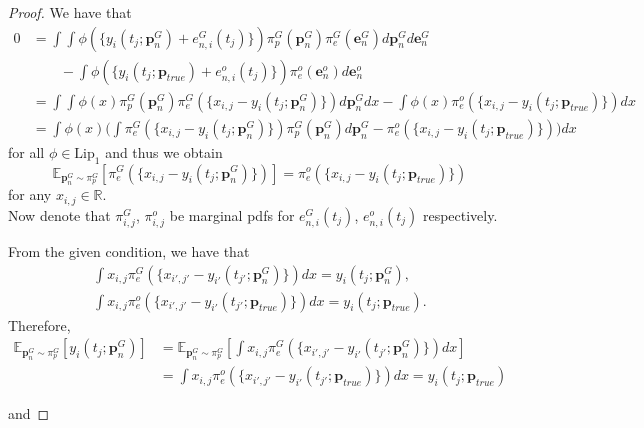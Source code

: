 \documentclass[letterpaper]{article} %
\theoremstyle{thmstyleone}%
\theoremstyle{thmstyletwo}%
\theoremstyle{thmstylethree}%
\begin{document}
\begin{proof}We have that
\begin{align*}
0 &= \int\int \phi(\{y_{i}(t_{j};\mathbf{p}_{n}^{G})+e_{n,i}^{G}(t_{j})\})\pi_{p}^{G}(\mathbf{p}_{n}^{G})
\pi_{e}^{G}(\mathbf{e}_{n}^{G})d\mathbf{p}_{n}^{G}d\mathbf{e}_{n}^{G}\\
 & \quad\quad -\int \phi(\{y_{i}(t_{j};\mathbf{p}_{true})+e_{n,i}^{o}(t_{j})\})\pi_{e}^{o}(\mathbf{e}_{n}^{o})d\mathbf{e}_{n}^{o} \\ 
&= \int\int \phi(x)\pi_{p}^{G}(\mathbf{p}_{n}^{G})\pi_{e}^{G}(\{x_{i,j}-y_{i}(t_{j};\mathbf{p}_{n}^{G})\})d\mathbf{p}_{n}^{G}dx-
\int \phi(x)\pi_{e}^{o}(\{x_{i,j}-y_{i}(t_{j};\mathbf{p}_{true})\})dx \\ &=\int \phi(x)\Bigg(
\int \pi_{e}^{G}(\{x_{i,j}-y_{i}(t_{j};\mathbf{p}_{n}^{G})\})\pi_{p}^{G}(\mathbf{p}_{n}^{G})d\mathbf{p}_{n}^{G}-\pi_{e}^{o}(\{x_{i,j}-y_{i}(t_{j};\mathbf{p}_{true})\})\Bigg)dx \end{align*} for all $\phi \in \text{Lip}_{1}$
and thus we obtain 
\[\mathbb{E}_{\mathbf{p}_{n}^{G} \sim \pi_{p}^{G}}[\pi_{e}^{G}(\{x_{i,j}-y_{i}(t_{j};\mathbf{p}_{n}^{G})\})]=\pi_{e}^{o}(\{x_{i,j}-y_{i}(t_{j};\mathbf{p}_{true})\})\] for any $x_{i,j} \in \mathbb{R}$. \\
Now denote that $\pi_{i,j}^{G}$, $\pi_{i,j}^{o}$ be marginal pdfs for $e_{n,i}^{G}(t_{j})$, $e_{n,i}^{o}(t_{j})$ respectively.

From the given condition, we have that 
\begin{align*}
    \int x_{i,j}\pi_{e}^{G}(\{x_{i',j'}-y_{i'}(t_{j'};\mathbf{p}_{n}^{G})\})dx = y_{i}(t_{j};\mathbf{p}_{n}^{G}),\\ 
\int x_{i,j}\pi_{e}^{o}(\{x_{i',j'}-y_{i'}(t_{j'};\mathbf{p}_{true})\})dx = y_{i}(t_{j};\mathbf{p}_{true}).
\end{align*}
Therefore,
\begin{align*}
\mathbb{E}_{\mathbf{p}_{n}^{G} \sim \pi_{p}^{G}}[y_{i}(t_{j};\mathbf{p}_{n}^{G})] 
&= \mathbb{E}_{\mathbf{p}_{n}^{G} \sim \pi_{p}^{G}}[\int x_{i,j}\pi_{e}^{G}(\{x_{i',j'}-y_{i'}(t_{j'};\mathbf{p}_{n}^{G})\})dx] \\
&= \int x_{i,j}\pi_{e}^{o}(\{x_{i',j'}-y_{i'}(t_{j'};\mathbf{p}_{true})\})dx = y_{i}(t_{j};\mathbf{p}_{true})
\end{align*} 

and 


\end{proof}
\end{document}
